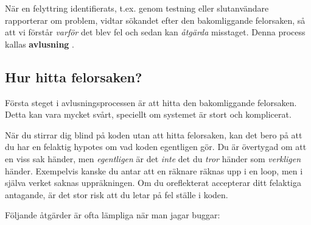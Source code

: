 När en felyttring identifierats, t.ex. genom testning eller slutanvändare rapporterar om problem, vidtar sökandet efter den bakomliggande felorsaken, så att vi förstår \emph{varför} det blev fel och sedan kan \emph{åtgärda} misstaget. Denna process kallas \textbf{avlusning} .




\subsection{Hur hitta felorsaken?}

Första steget i avlusningsprocessen är att hitta den bakomliggande felorsaken. Detta kan vara mycket svårt, speciellt om systemet är stort och komplicerat.

När du stirrar dig blind på koden utan att hitta felorsaken, kan det bero på att du har en felaktig hypotes om vad koden egentligen gör. Du är övertygad om att en viss sak händer, men \emph{egentligen} är det \emph{inte} det du \emph{tror} händer som \emph{verkligen} händer. Exempelvis kanske du antar att en räknare räknas upp i en loop, men i själva verket saknas uppräkningen. Om du oreflekterat accepterar ditt felaktiga antagande, är det stor risk att du letar på fel ställe i koden.

Följande åtgärder är ofta lämpliga när man jagar buggar:


